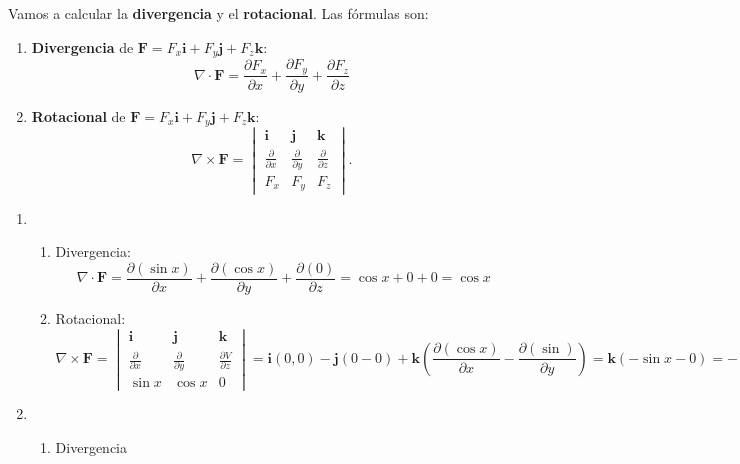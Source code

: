 \begin{enumerate}[label=\color{red}\textbf{\arabic*)}]
    Vamos a calcular la \textbf{divergencia} y el \textbf{rotacional}. Las fórmulas son: 
\begin{enumerate}[label=\arabic*)]
  \item \textbf{Divergencia} de $\mathbf{F}=F_x\mathbf{i} +F_y\mathbf{j} +F_z\mathbf{k}:$ 
    \[
    \nabla \cdot \mathbf{F} =\frac{\partial F_x}{\partial x} +\frac{\partial F_y}{\partial y} +\frac{\partial F_z}{\partial z} 
    \] 
  \item \textbf{Rotacional} de $\mathbf{F} =F_x\mathbf{i} +F_y\mathbf{j} +F_z\mathbf{k} $:
    \[
    \nabla \times \mathbf{F} =\begin{vmatrix} 
      \mathbf{i}  & \mathbf{j} & \mathbf{k} \\
      \frac{\partial }{\partial x} & \frac{\partial }{\partial y} & \frac{\partial }{\partial z} \\
      F_x & F_y & F_z
    \end{vmatrix}. 
    \] 
\end{enumerate}
    \begin{enumerate}[label=\color{red}\textbf{\alph*)}]
      \item {} 
        \begin{enumerate}[label=\arabic*)]
          \item Divergencia:
            \[
              \nabla \cdot \mathbf{F} =\frac{\partial (\sin x)}{\partial x} +\frac{\partial (\cos x)}{\partial y} +\frac{\partial (0)}{\partial z} = \cos x+0+0=\cos x
            \] 
          \item Rotacional:
            \[
            \nabla \times \mathbf{F} = \begin{vmatrix} 
              \mathbf{i}  & \mathbf{j} & \mathbf{k} \\
              \frac{\partial }{\partial x} & \frac{\partial }{\partial y} & \frac{\partial V}{\partial z} \\
              \sin x & \cos x & 0
            \end{vmatrix} =\mathbf{i} (0,0)-\mathbf{j} (0-0)+\mathbf{k} \left( \frac{\partial (\cos x)}{\partial x} -\frac{\partial (\sin )}{\partial y}  \right) =\mathbf{k} (-\sin x-0)=-\sin x\mathbf{k} 
            \] 
        \end{enumerate}
      \item {} 
        \begin{enumerate}[label=\arabic*)]
          \item Divergencia

\end{enumerate}
\end{enumerate}
\end{enumerate}
